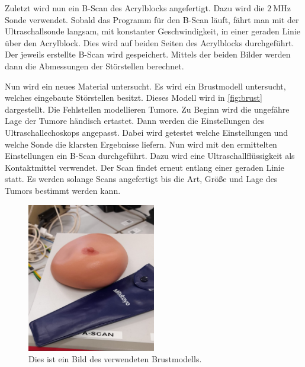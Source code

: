 Zuletzt wird nun ein B-Scan des Acrylblocks angefertigt. Dazu wird die $\qty{2}{\mega\hertz}$ Sonde verwendet. Sobald das Programm für den B-Scan läuft, fährt man mit der Ultraschallsonde
langsam, mit konstanter Geschwindigkeit, in einer geraden Linie über den Acrylblock. Dies wird auf beiden Seiten des Acrylblocks durchgeführt. Der jeweils erstellte B-Scan wird gespeichert.
Mittels der beiden Bilder werden dann die Abmessungen der Störstellen berechnet. 

Nun wird ein neues Material untersucht. Es wird ein Brustmodell untersucht, welches eingebaute Störstellen besitzt. Dieses Modell wird in \autoref{fig:brust} dargestellt. Die Fehlstellen modellieren Tumore. Zu Beginn wird die ungefähre Lage der 
Tumore händisch ertastet. Dann werden die Einstellungen des Ultraschallechoskops angepasst. Dabei wird getestet welche Einstellungen und welche Sonde die klarsten Ergebnisse liefern.
Nun wird mit den ermittelten Einstellungen ein B-Scan durchgeführt. Dazu wird eine Ultraschallflüssigkeit als Kontaktmittel verwendet. Der Scan findet erneut entlang einer geraden 
Linie statt. Es werden solange Scans angefertigt bis die Art, Größe und Lage des Tumors bestimmt werden kann.

\begin{figure}
    \centering
	\includegraphics[width=0.5\textwidth]{content/Titte1.jpg}
    \caption{Dies ist ein Bild des verwendeten Brustmodells.}
    \label{fig:brust}
\end{figure}